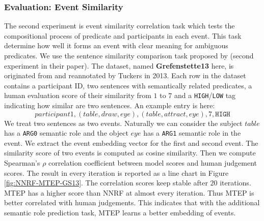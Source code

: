 \documentclass[a4paper]{article}
\begin{document}
\subsubsection{Evaluation: Event Similarity} \label{sec:comp-eventsim}
The second experiment is event similarity correlation task which tests the compositional process of predicate and participants in each event. This task determine how well it forms an event with clear meaning for ambiguous predicates. We use the sentence similarity comparison task proposed by \citet{grefenstette2015concrete} (second experiment in their paper). The dataset, named \textbf{Grefenstette13} here, is originated from \citet{grefenstette2011experimental} and reannotated by Tuckers in 2013. Each row in the dataset contains a participant ID, two sentences with semantically related predicates, a human evaluation score of their similarity from $1$ to $7$ and a \texttt{HIGH}/\texttt{LOW} tag indicating how similar are two sentences. An example entry is here:
\begin{equation} \label{eg:event-sim}
    participant1, (table, draw, eye), (table, attract, eye), 7, \texttt{HIGH}
\end{equation}
We treat two sentences as two events. Naturally we can consider the subject $table$ has a \texttt{ARG0} semantic role and the object $eye$ has a \texttt{ARG1} semantic role in the event. We extract the event embedding vector for the first and second event. The similarity score of two events is computed as cosine similarity. Then we compute Spearman's $\rho$ correlation coefficient between model scores and human judgement scores. The result in every iteration is reported as a line chart in Figure \ref{fig:NNRF-MTEP-GS13}. The correlation scores keep stable after $20$ iterations. MTEP has a higher score than NNRF at almost every iteration. Thus MTEP is better correlated with human judgements. This indicates that with the additional semantic role prediction task, MTEP learns a better embedding of events. 
\end{document}
